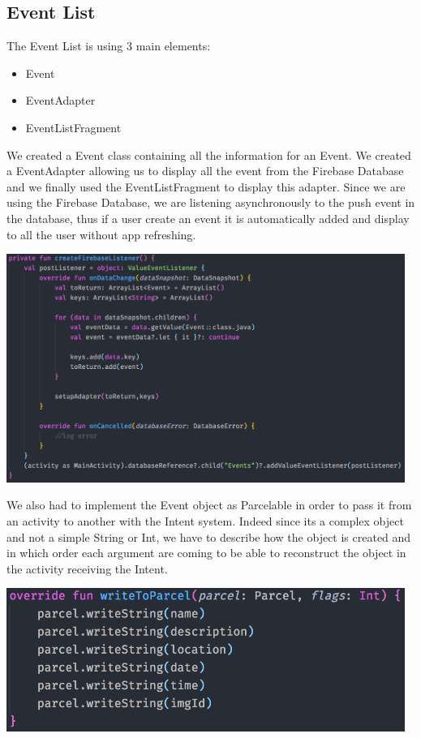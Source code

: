 \documentclass[a4paper,11pt, oneside]{book}
\begin{document}
		\subsection{Event List}	

		The Event List is using 3 main elements: 
		\begin{itemize}
			\item Event
			\item EventAdapter
			\item EventListFragment
		\end{itemize}

		We created a Event class containing all the information for an Event. We created a EventAdapter allowing
		us to display all the event from the Firebase Database and we finally used the EventListFragment to display this 
		adapter. Since we are using the Firebase Database, we are listening asynchronously to the push event in the database, 
		thus if a user create an event it is automatically added and display to all the user without app refreshing.

		\includegraphics[width=13cm]{./img/firebaselistener.png}

		We also had to implement the Event object as Parcelable in order to pass it from an activity to another with the Intent
		system. Indeed since its a complex object and not a simple String or Int, we have to describe how the object is created
		and in which order each argument are coming to be able to reconstruct the object in the activity receiving the Intent.

		\includegraphics[width=13cm]{./img/parcelable.png}
\end{document}

